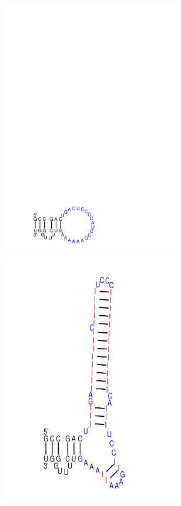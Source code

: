 \begin{figure}[H]
\begin{subfigure}{0.3\textwidth}
    \includegraphics[clip, trim=0 0 0 15cm, width=0.85\textwidth]{../img/alg/insert/3/multibranch-del}
  \end{subfigure}
  \begin{subfigure}{0.3\textwidth}
    \includegraphics[clip, trim=0 0 0 2cm, width=0.85\textwidth]{../img/alg/insert/3/multibranch-del-ins}

\end{subfigure}
\end{figure}
